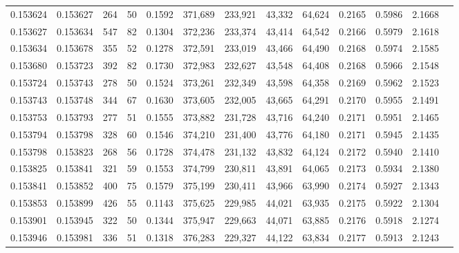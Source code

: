 \begin{tabular}{rrrrrrrrrrrrr}
0.153624 & 0.153627 &   264 &  50 &                                     0.1592 & 371,689 & 233,921 &  43,332 &  64,624 & 0.2165 & 0.5986 & 2.1668 \\
0.153627 & 0.153634 &   547 &  82 &                                     0.1304 & 372,236 & 233,374 &  43,414 &  64,542 & 0.2166 & 0.5979 & 2.1618 \\
0.153634 & 0.153678 &   355 &  52 &                                     0.1278 & 372,591 & 233,019 &  43,466 &  64,490 & 0.2168 & 0.5974 & 2.1585 \\
0.153680 & 0.153723 &   392 &  82 &                                     0.1730 & 372,983 & 232,627 &  43,548 &  64,408 & 0.2168 & 0.5966 & 2.1548 \\
0.153724 & 0.153743 &   278 &  50 &                                     0.1524 & 373,261 & 232,349 &  43,598 &  64,358 & 0.2169 & 0.5962 & 2.1523 \\
0.153743 & 0.153748 &   344 &  67 &                                     0.1630 & 373,605 & 232,005 &  43,665 &  64,291 & 0.2170 & 0.5955 & 2.1491 \\
0.153753 & 0.153793 &   277 &  51 &                                     0.1555 & 373,882 & 231,728 &  43,716 &  64,240 & 0.2171 & 0.5951 & 2.1465 \\
0.153794 & 0.153798 &   328 &  60 &                                     0.1546 & 374,210 & 231,400 &  43,776 &  64,180 & 0.2171 & 0.5945 & 2.1435 \\
0.153798 & 0.153823 &   268 &  56 &                                     0.1728 & 374,478 & 231,132 &  43,832 &  64,124 & 0.2172 & 0.5940 & 2.1410 \\
0.153825 & 0.153841 &   321 &  59 &                                     0.1553 & 374,799 & 230,811 &  43,891 &  64,065 & 0.2173 & 0.5934 & 2.1380 \\
0.153841 & 0.153852 &   400 &  75 &                                     0.1579 & 375,199 & 230,411 &  43,966 &  63,990 & 0.2174 & 0.5927 & 2.1343 \\
0.153853 & 0.153899 &   426 &  55 &                                     0.1143 & 375,625 & 229,985 &  44,021 &  63,935 & 0.2175 & 0.5922 & 2.1304 \\
0.153901 & 0.153945 &   322 &  50 &                                     0.1344 & 375,947 & 229,663 &  44,071 &  63,885 & 0.2176 & 0.5918 & 2.1274 \\
0.153946 & 0.153981 &   336 &  51 &                                     0.1318 & 376,283 & 229,327 &  44,122 &  63,834 & 0.2177 & 0.5913 & 2.1243 \\

\end{tabular}
